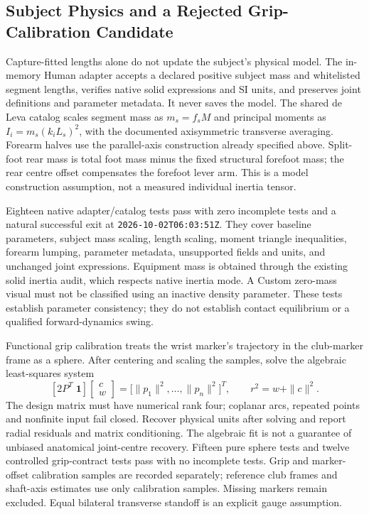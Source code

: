 \documentclass[11pt,a4paper]{article}
\begin{document}
\subsection{Subject Physics and a Rejected Grip-Calibration Candidate}
Capture-fitted lengths alone do not update the subject's physical model.
The in-memory Human adapter accepts a declared positive subject mass and
whitelisted segment lengths, verifies native solid expressions and SI units,
and preserves joint definitions and parameter metadata. It never saves the
model. The shared de Leva catalog scales segment mass as $m_s=f_sM$ and
principal moments as $I_i=m_s(k_iL_s)^2$, with the documented axisymmetric
transverse averaging. Forearm halves use the parallel-axis construction
already specified above. Split-foot rear mass is total foot mass minus the
fixed structural forefoot mass; the rear centre offset compensates the
forefoot lever arm. This is a model construction assumption, not a measured
individual inertia tensor.

Eighteen native adapter/catalog tests pass with zero incomplete tests and a
natural successful exit at \texttt{2026-10-02T06:03:51Z}. They cover baseline
parameters, subject mass scaling, length scaling, moment triangle inequalities,
forearm lumping, parameter metadata, unsupported fields and units, and
unchanged joint expressions. Equipment mass is obtained through the existing
solid inertia audit, which respects native inertia mode. A Custom zero-mass
visual must not be classified using an inactive density parameter. These
tests establish parameter consistency; they do not establish contact
equilibrium or a qualified forward-dynamics swing.

Functional grip calibration treats the wrist marker's trajectory in the
club-marker frame as a sphere. After centering and scaling the samples,
solve the algebraic least-squares system
\[
 [2P^T\;\mathbf{1}]
 \begin{bmatrix}c\\w\end{bmatrix}
 = \bigl[\|p_1\|^2,\ldots,\|p_n\|^2\bigr]^T,
 \qquad r^2=w+\|c\|^2.
\]
The design matrix must have numerical rank four; coplanar arcs, repeated
points and nonfinite input fail closed. Recover physical units after solving
and report radial residuals and matrix conditioning. The algebraic fit is
not a guarantee of unbiased anatomical joint-centre recovery. Fifteen pure
sphere tests and twelve controlled grip-contract tests pass with no incomplete
tests. Grip and marker-offset calibration samples are recorded separately;
reference club frames and shaft-axis estimates use only calibration samples.
Missing markers remain excluded. Equal bilateral transverse standoff is an
explicit gauge assumption.
\end{document}
